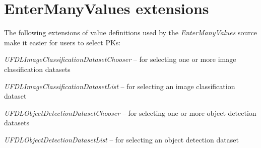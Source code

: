 \documentclass[a4paper]{book}
\begin{document}
\section{EnterManyValues extensions}
The following extensions of value definitions used by the \textit{EnterManyValues}
source make it easier for users to select PKs:
\begin{tight_itemize}
  \item \textit{UFDLImageClassificationDatasetChooser} -- for selecting one or more image classification datasets
  \item \textit{UFDLImageClassificationDatasetList} -- for selecting an image classification dataset
  \item \textit{UFDLObjectDetectionDatasetChooser} -- for selecting one or more object detection datasets
  \item \textit{UFDLObjectDetectionDatasetList} -- for selecting an object detection dataset
\end{tight_itemize}


\end{document}

